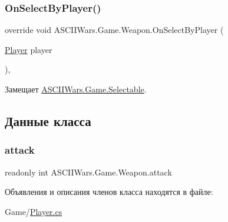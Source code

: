 \subsubsection{\texorpdfstring{On\+Select\+By\+Player()}{OnSelectByPlayer()}}
{\footnotesize\ttfamily override void A\+S\+C\+I\+I\+Wars.\+Game.\+Weapon.\+On\+Select\+By\+Player (\begin{DoxyParamCaption}\item[{\hyperlink{class_a_s_c_i_i_wars_1_1_game_1_1_player}{Player}}]{player }\end{DoxyParamCaption})\hspace{0.3cm}{\ttfamily [inline]}, {\ttfamily [virtual]}}



Замещает \hyperlink{class_a_s_c_i_i_wars_1_1_game_1_1_selectable_a95bdcf05ef9ea5f39c81ddd96294968a}{A\+S\+C\+I\+I\+Wars.\+Game.\+Selectable}.



\subsection{Данные класса}
\hypertarget{class_a_s_c_i_i_wars_1_1_game_1_1_weapon_a70166ce84757794de92f0a52de55bb04}{}\label{class_a_s_c_i_i_wars_1_1_game_1_1_weapon_a70166ce84757794de92f0a52de55bb04} 
\subsubsection{\texorpdfstring{attack}{attack}}
{\footnotesize\ttfamily readonly int A\+S\+C\+I\+I\+Wars.\+Game.\+Weapon.\+attack}



Объявления и описания членов класса находятся в файле\+:\begin{DoxyCompactItemize}
\item 
Game/\hyperlink{_player_8cs}{Player.\+cs}\end{DoxyCompactItemize}
